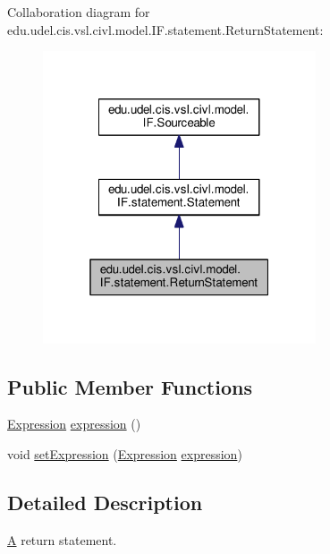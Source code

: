 Collaboration diagram for edu.\+udel.\+cis.\+vsl.\+civl.\+model.\+I\+F.\+statement.\+Return\+Statement\+:
\nopagebreak
\begin{figure}[H]
\begin{center}
\leavevmode
\includegraphics[width=229pt]{interfaceedu_1_1udel_1_1cis_1_1vsl_1_1civl_1_1model_1_1IF_1_1statement_1_1ReturnStatement__coll__graph}
\end{center}
\end{figure}
\subsection*{Public Member Functions}
\begin{DoxyCompactItemize}
\item 
\hyperlink{interfaceedu_1_1udel_1_1cis_1_1vsl_1_1civl_1_1model_1_1IF_1_1expression_1_1Expression}{Expression} \hyperlink{interfaceedu_1_1udel_1_1cis_1_1vsl_1_1civl_1_1model_1_1IF_1_1statement_1_1ReturnStatement_a2bf2ea880e785f4595466b0e6d98f701}{expression} ()
\item 
void \hyperlink{interfaceedu_1_1udel_1_1cis_1_1vsl_1_1civl_1_1model_1_1IF_1_1statement_1_1ReturnStatement_ab681785e7bbb3259a0604f56679312d5}{set\+Expression} (\hyperlink{interfaceedu_1_1udel_1_1cis_1_1vsl_1_1civl_1_1model_1_1IF_1_1expression_1_1Expression}{Expression} \hyperlink{interfaceedu_1_1udel_1_1cis_1_1vsl_1_1civl_1_1model_1_1IF_1_1statement_1_1ReturnStatement_a2bf2ea880e785f4595466b0e6d98f701}{expression})
\end{DoxyCompactItemize}


\subsection{Detailed Description}
\hyperlink{structA}{A} return statement. 

